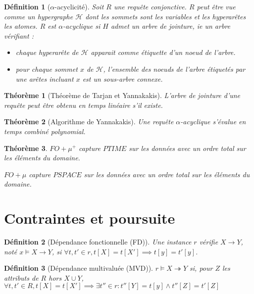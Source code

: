 \documentclass[landscape]{article}
\renewcommand{\H}{\mathscr{H}}
\newcommand{\1}{\mathbbm{1}}
\newcommand{\0}{\mathbbm{0}}
\newtheorem{theo}{Théorème}
\newtheorem{defi}{Définition}
\begin{document}
\begin{multicols}{2}
    \begin{defi}[$\alpha$-acyclicité]
        Soit $R$ une requête conjonctive. $R$ peut être vue comme un hypergraphe $\H$
        dont les sommets sont les variables et les hyperarêtes les atomes. $R$ est
        $\alpha$-acyclique si $H$ admet un arbre de jointure, ie un arbre vérifiant :
        \begin{itemize}
            \item chaque hyperarête de $\H$ apparait comme étiquette d'un noeud de l'arbre.
            \item pour chaque sommet $x$ de $\H$, l'ensemble des noeuds de l'arbre étiquetés
                par une arêtes incluant $x$ est un sous-arbre connexe.
        \end{itemize}
    \end{defi}

    \begin{theo}[Théorème de Tarjan et Yannakakis]
        L'arbre de jointure d'une requête peut être obtenu en temps linéaire
        s'il existe.
    \end{theo}

    \begin{theo}[Algorithme de Yannakakis]
        Une requête $\alpha$-acyclique s'évalue en temps combiné polynomial.
    \end{theo}

    \begin{theo} $FO+\mu^+$ capture $PTIME$ sur les données avec un ordre total sur
        les éléments du domaine.
        
        $FO+\mu$ capture $PSPACE$ sur les données avec un ordre total sur les éléments
        du domaine.
    \end{theo}

    \section{Contraintes et poursuite}

    \begin{defi}[Dépendance fonctionnelle (FD)]
        Une instance $r$ vérifie $X\rightarrow Y$, noté $x\models X\rightarrow Y$,
        si $\forall t, t'\in r, t[X] = t[X']\implies t[y] = t'[y]$.
    \end{defi}

    \begin{defi}[Dépendance multivaluée (MVD)]
        $r\models X\twoheadrightarrow Y$ si, pour $Z$ les attributs de $R$ hors
        $X\cup Y$, $\forall t, t'\in R, t[X] = t[X'] \implies \exists t''\in r:
        t''[Y] = t[y] \wedge t''[Z] = t'[Z]$
    \end{defi}


\end{multicols}
\end{document}
